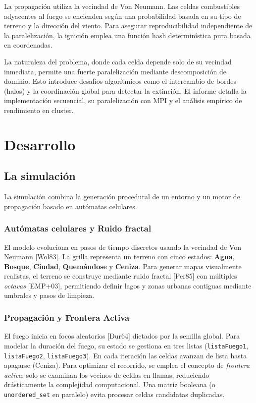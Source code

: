\documentclass[10pt,a4paper]{article}
\begin{document}
La propagación utiliza la vecindad de Von Neumann. Las celdas combustibles adyacentes al fuego se encienden según una probabilidad basada en su tipo de terreno y la dirección del viento. Para asegurar reproducibilidad independiente de la paralelización, la ignición emplea una función hash determinística pura basada en coordenadas.

La naturaleza del problema, donde cada celda depende solo de su vecindad inmediata, permite una fuerte paralelización mediante descomposición de dominio. Esto introduce desafíos algorítmicos como el intercambio de bordes (halos) y la coordinación global para detectar la extinción. El informe detalla la implementación secuencial, su paralelización con MPI y el análisis empírico de rendimiento en cluster.

\section{Desarrollo}

\subsection{La simulación}
La simulación combina la generación procedural de un entorno y un motor de propagación basado en autómatas celulares.

\subsubsection{Autómatas celulares y Ruido fractal}
El modelo evoluciona en pasos de tiempo discretos usando la vecindad de Von Neumann [Wol83]. La grilla representa un terreno con cinco estados: \textbf{Agua}, \textbf{Bosque}, \textbf{Ciudad}, \textbf{Quemándose} y \textbf{Ceniza}. Para generar mapas visualmente realistas, el terreno se construye mediante ruido fractal [Per85] con múltiples \textit{octavas} [EMP+03], permitiendo definir lagos y zonas urbanas contiguas mediante umbrales y pasos de limpieza.

\subsubsection{Propagación y Frontera Activa}
El fuego inicia en focos aleatorios [Dur64] dictados por la semilla global. Para modelar la duración del fuego, su estado se gestiona en tres listas (\texttt{listaFuego1}, \texttt{listaFuego2}, \texttt{listaFuego3}). En cada iteración las celdas avanzan de lista hasta apagarse (Ceniza). 
Para optimizar el recorrido, se emplea el concepto de \textit{frontera activa}: solo se examinan los vecinos de celdas en llamas, reduciendo drásticamente la complejidad computacional. Una matriz booleana (o \texttt{unordered\_set} en paralelo) evita procesar celdas candidatas duplicadas.
\end{document}
